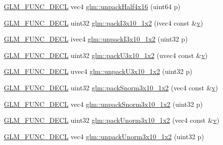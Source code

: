 \begin{DoxyCompactItemize}
\item 
\mbox{\hyperlink{setup_8hpp_ab2d052de21a70539923e9bcbf6e83a51}{G\+L\+M\+\_\+\+F\+U\+N\+C\+\_\+\+D\+E\+CL}} vec4 \mbox{\hyperlink{group__gtc__packing_gaea526d6491ad40401eac34803984bf27}{glm\+::unpack\+Half4x16}} (uint64 p)
\item 
\mbox{\hyperlink{setup_8hpp_ab2d052de21a70539923e9bcbf6e83a51}{G\+L\+M\+\_\+\+F\+U\+N\+C\+\_\+\+D\+E\+CL}} uint32 \mbox{\hyperlink{group__gtc__packing_ga032e18fa5bc5b8f3897104aeb2f1e195}{glm\+::pack\+I3x10\+\_\+1x2}} (ivec4 const \&\mbox{\hyperlink{glad_8h_a14cfbe2fc2234f5504618905b69d1e06}{v}})
\item 
\mbox{\hyperlink{setup_8hpp_ab2d052de21a70539923e9bcbf6e83a51}{G\+L\+M\+\_\+\+F\+U\+N\+C\+\_\+\+D\+E\+CL}} ivec4 \mbox{\hyperlink{group__gtc__packing_ga08bcd34cf9c34701d658dd861ee6e300}{glm\+::unpack\+I3x10\+\_\+1x2}} (uint32 p)
\item 
\mbox{\hyperlink{setup_8hpp_ab2d052de21a70539923e9bcbf6e83a51}{G\+L\+M\+\_\+\+F\+U\+N\+C\+\_\+\+D\+E\+CL}} uint32 \mbox{\hyperlink{group__gtc__packing_gaf656d8862628f96b20de7a36eaa1fe56}{glm\+::pack\+U3x10\+\_\+1x2}} (uvec4 const \&\mbox{\hyperlink{glad_8h_a14cfbe2fc2234f5504618905b69d1e06}{v}})
\item 
\mbox{\hyperlink{setup_8hpp_ab2d052de21a70539923e9bcbf6e83a51}{G\+L\+M\+\_\+\+F\+U\+N\+C\+\_\+\+D\+E\+CL}} uvec4 \mbox{\hyperlink{group__gtc__packing_ga119aa2d7d55952f9dc4214390a6ffefc}{glm\+::unpack\+U3x10\+\_\+1x2}} (uint32 p)
\item 
\mbox{\hyperlink{setup_8hpp_ab2d052de21a70539923e9bcbf6e83a51}{G\+L\+M\+\_\+\+F\+U\+N\+C\+\_\+\+D\+E\+CL}} uint32 \mbox{\hyperlink{group__gtc__packing_ga0d4157cec37c0312216a7be1cc92df54}{glm\+::pack\+Snorm3x10\+\_\+1x2}} (vec4 const \&\mbox{\hyperlink{glad_8h_a14cfbe2fc2234f5504618905b69d1e06}{v}})
\item 
\mbox{\hyperlink{setup_8hpp_ab2d052de21a70539923e9bcbf6e83a51}{G\+L\+M\+\_\+\+F\+U\+N\+C\+\_\+\+D\+E\+CL}} vec4 \mbox{\hyperlink{group__gtc__packing_ga8b8bb827a3743ca553d8702d3e337101}{glm\+::unpack\+Snorm3x10\+\_\+1x2}} (uint32 p)
\item 
\mbox{\hyperlink{setup_8hpp_ab2d052de21a70539923e9bcbf6e83a51}{G\+L\+M\+\_\+\+F\+U\+N\+C\+\_\+\+D\+E\+CL}} uint32 \mbox{\hyperlink{group__gtc__packing_ga2cf2d11b40bd48639110456fd74c2e33}{glm\+::pack\+Unorm3x10\+\_\+1x2}} (vec4 const \&\mbox{\hyperlink{glad_8h_a14cfbe2fc2234f5504618905b69d1e06}{v}})
\item 
\mbox{\hyperlink{setup_8hpp_ab2d052de21a70539923e9bcbf6e83a51}{G\+L\+M\+\_\+\+F\+U\+N\+C\+\_\+\+D\+E\+CL}} vec4 \mbox{\hyperlink{group__gtc__packing_gaf69ace2b5e9234f8afb4e99c3df1193d}{glm\+::unpack\+Unorm3x10\+\_\+1x2}} (uint32 p)

\end{DoxyCompactItemize}
